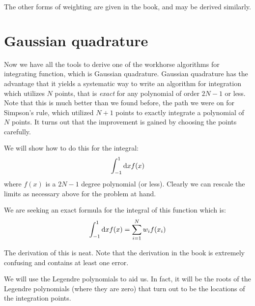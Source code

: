 The other forms of weighting are given in the book, and may be derived
similarly. 

\section{Gaussian quadrature}

Now we have all the tools to derive one of the workhorse algorithms
for integrating function, which is Gaussian quadrature. Gaussian
quadrature has the advantage that it yields a systematic way to write
an algorithm for integration which utilizes $N$ points, that is {\it
  exact} for any polynomial of order $2N-1$ or less. Note that this is
much better than we found before, the path we were on for Simpson's
rule, which utilized $N+1$ points to exactly integrate a polynomial of
$N$ points. It turns out that the improvement is gained by choosing
the points carefully.

We will show how to do this for the integral:
\begin{equation}
\int_{-1}^{1} {\rm d}x f(x)
\end{equation}
where $f(x)$ is a $2N-1$ degree polynomial (or less).  Clearly we can
rescale the limits as necessary above for the problem at hand.

We are seeking an exact formula for the integral of this function
which is:
\begin{equation}
\int_{-1}^{1} {\rm d}x f(x) = \sum_{i=1}^N w_i f(x_i)
\end{equation}

The derivation of this is neat. Note that the derivation in the book
is extremely confusing and contains at least one error.

We will use the Legendre polynomials to aid us. In fact, it will be
the roots of the Legendre polynomials (where they are zero) that turn
out to be the locations of the integration points.


